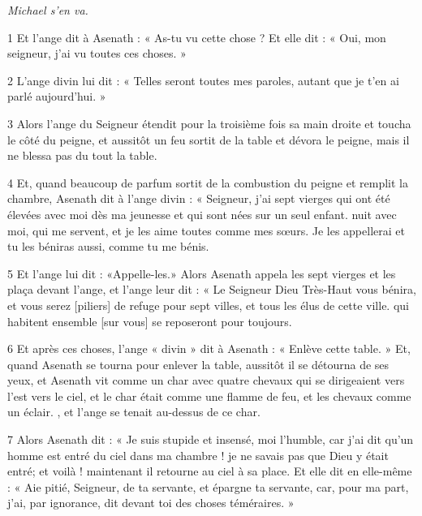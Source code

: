 
\par \textit{Michael s'en va.}

\par 1 Et l'ange dit à Asenath : « As-tu vu cette chose ? Et elle dit : « Oui, mon seigneur, j'ai vu toutes ces choses. »

\par 2 L'ange divin lui dit : « Telles seront toutes mes paroles, autant que je t'en ai parlé aujourd'hui. »

\par 3 Alors l'ange du Seigneur étendit pour la troisième fois sa main droite et toucha le côté du peigne, et aussitôt un feu sortit de la table et dévora le peigne, mais il ne blessa pas du tout la table.

\par 4 Et, quand beaucoup de parfum sortit de la combustion du peigne et remplit la chambre, Asenath dit à l'ange divin : « Seigneur, j'ai sept vierges qui ont été élevées avec moi dès ma jeunesse et qui sont nées sur un seul enfant. nuit avec moi, qui me servent, et je les aime toutes comme mes sœurs. Je les appellerai et tu les béniras aussi, comme tu me bénis.

\par 5 Et l'ange lui dit : «Appelle-les.» Alors Asenath appela les sept vierges et les plaça devant l'ange, et l'ange leur dit : « Le Seigneur Dieu Très-Haut vous bénira, et vous serez [piliers] de refuge pour sept villes, et tous les élus de cette ville. qui habitent ensemble [sur vous] se reposeront pour toujours.

\par 6 Et après ces choses, l'ange « divin » dit à Asenath : « Enlève cette table. » Et, quand Asenath se tourna pour enlever la table, aussitôt il se détourna de ses yeux, et Asenath vit comme un char avec quatre chevaux qui se dirigeaient vers l'est vers le ciel, et le char était comme une flamme de feu, et les chevaux comme un éclair. , et l'ange se tenait au-dessus de ce char.

\par 7 Alors Asenath dit : « Je suis stupide et insensé, moi l'humble, car j'ai dit qu'un homme est entré du ciel dans ma chambre ! je ne savais pas que Dieu y était entré; et voilà ! maintenant il retourne au ciel à sa place. Et elle dit en elle-même : « Aie pitié, Seigneur, de ta servante, et épargne ta servante, car, pour ma part, j'ai, par ignorance, dit devant toi des choses téméraires. »

